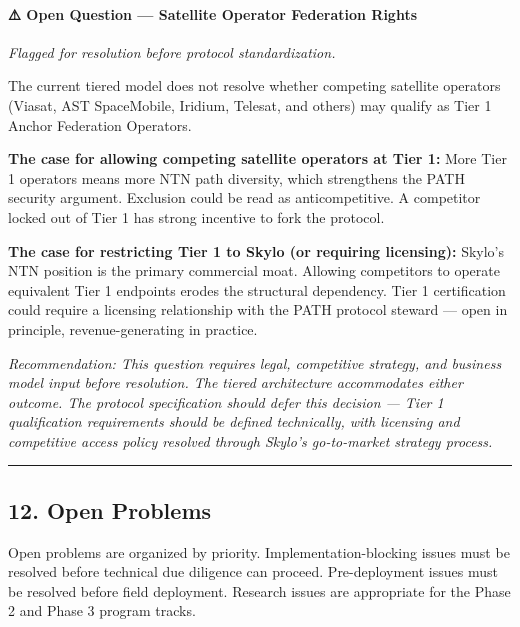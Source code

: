 \documentclass[
  11pt,
]{article}
\begin{document}
\hypertarget{open-question-satellite-operator-federation-rights}{%
\paragraph{⚠️ Open Question --- Satellite Operator Federation
Rights}\label{open-question-satellite-operator-federation-rights}}

\emph{Flagged for resolution before protocol standardization.}

The current tiered model does not resolve whether competing satellite
operators (Viasat, AST SpaceMobile, Iridium, Telesat, and others) may
qualify as Tier 1 Anchor Federation Operators.

\textbf{The case for allowing competing satellite operators at Tier 1:}
More Tier 1 operators means more NTN path diversity, which strengthens
the PATH security argument. Exclusion could be read as anticompetitive.
A competitor locked out of Tier 1 has strong incentive to fork the
protocol.

\textbf{The case for restricting Tier 1 to Skylo (or requiring
licensing):} Skylo's NTN position is the primary commercial moat.
Allowing competitors to operate equivalent Tier 1 endpoints erodes the
structural dependency. Tier 1 certification could require a licensing
relationship with the PATH protocol steward --- open in principle,
revenue-generating in practice.

\emph{Recommendation: This question requires legal, competitive
strategy, and business model input before resolution. The tiered
architecture accommodates either outcome. The protocol specification
should defer this decision --- Tier 1 qualification requirements should
be defined technically, with licensing and competitive access policy
resolved through Skylo's go-to-market strategy process.}

\begin{center}\rule{0.5\linewidth}{0.5pt}\end{center}

\hypertarget{open-problems}{%
\subsection{12. Open Problems}\label{open-problems}}

Open problems are organized by priority. Implementation-blocking issues
must be resolved before technical due diligence can proceed.
Pre-deployment issues must be resolved before field deployment. Research
issues are appropriate for the Phase 2 and Phase 3 program tracks.
\end{document}
